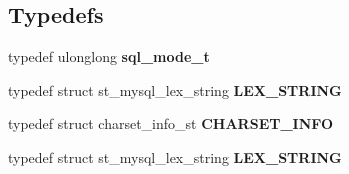 \subsection*{Typedefs}
\begin{DoxyCompactItemize}
\item 
\mbox{\label{group__Event__Scheduler_ga1dba8b6567061f45e6b9df70480b5239}} 
typedef ulonglong {\bfseries sql\+\_\+mode\+\_\+t}
\item 
\mbox{\label{group__Event__Scheduler_gaae4159c1d82a5e7462befa8e1e047968}} 
typedef struct st\+\_\+mysql\+\_\+lex\+\_\+string {\bfseries L\+E\+X\+\_\+\+S\+T\+R\+I\+NG}
\item 
\mbox{\label{group__Event__Scheduler_ga6b9dc255527f6e48e938b5ef349d967c}} 
typedef struct charset\+\_\+info\+\_\+st {\bfseries C\+H\+A\+R\+S\+E\+T\+\_\+\+I\+N\+FO}
\item 
\mbox{\label{group__Event__Scheduler_gaae4159c1d82a5e7462befa8e1e047968}} 
typedef struct st\+\_\+mysql\+\_\+lex\+\_\+string {\bfseries L\+E\+X\+\_\+\+S\+T\+R\+I\+NG}
\end{DoxyCompactItemize}
